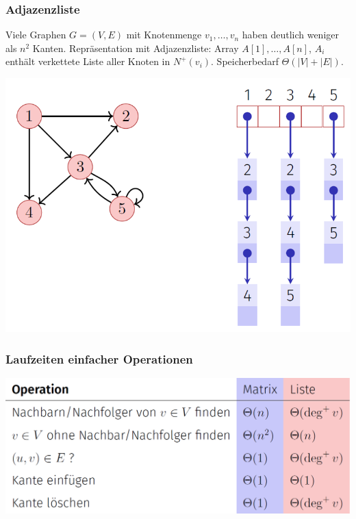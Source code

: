 \vspace{-4pt}
\begin{sectionbox}
\subsubsection{Adjazenzliste}\par\smallskip
Viele Graphen $G=(V, E)$ mit Knotenmenge $v_{1}, \ldots, v_{n}$ haben deutlich weniger als $n^{2}$ Kanten. Repräsentation mit Adjazenzliste: Array $A[1], \ldots, A[n]$, $A_{i}$ enthält verkettete Liste aller Knoten in $N^{+}\left(v_{i}\right)$. Speicherbedarf $\Theta\left(|V|+|E|\right)$.\par\smallskip
\begin{center}
    \includegraphics[width = 0.9\columnwidth]{../img/AdjList.png}
\end{center}

\subsubsection{Laufzeiten einfacher Operationen}\par\smallskip
\begin{center}
    \includegraphics[width = \columnwidth]{../img/AdjLaufzeiten.png}
\end{center}\smallskip
\end{sectionbox}
